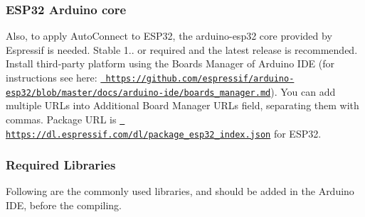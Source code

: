 \hypertarget{index_boardlib}{}\subsubsection{E\+S\+P32 Arduino core}\label{index_boardlib}
Also, to apply Auto\+Connect to E\+S\+P32, the arduino-\/esp32 core provided by Espressif is needed. Stable 1.. or required and the latest release is recommended. Install third-\/party platform using the Boards Manager of Arduino I\+DE (for instructions see here\+: \href{https://github.com/espressif/arduino-esp32/blob/master/docs/arduino-ide/boards_manager.md}{\texttt{ https\+://github.\+com/espressif/arduino-\/esp32/blob/master/docs/arduino-\/ide/boards\+\_\+manager.\+md}}). You can add multiple U\+R\+Ls into Additional Board Manager U\+R\+Ls field, separating them with commas. Package U\+RL is \href{https://dl.espressif.com/dl/package_esp32_index.json}{\texttt{ https\+://dl.\+espressif.\+com/dl/package\+\_\+esp32\+\_\+index.\+json}} for E\+S\+P32.\hypertarget{index_lib}{}\subsubsection{Required Libraries}\label{index_lib}
Following are the commonly used libraries, and should be added in the Arduino I\+DE, before the compiling.
